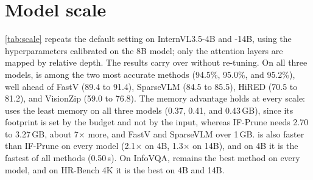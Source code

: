 \section{Model scale}
\label{sec:scale}



\cref{tab:scale} repeats the default setting on InternVL3.5-4B and \mbox{-14B}, using the hyperparameters
calibrated on the 8B model; only the attention layers are mapped by relative depth. The results
carry over without re-tuning. On all three models, \method is among the two most accurate methods
(94.5\%, 95.0\%, and 95.2\%), well ahead of FastV (89.4 to 91.4), SparseVLM (84.5 to 85.5), HiRED (70.5 to 81.2), and
VisionZip (59.0 to 76.8). The memory advantage holds at every scale: \method uses the least memory on all three models
(0.37, 0.41, and 0.43\,GB), since its footprint is set by the budget and not by the input, whereas
IF-Prune needs 2.70 to 3.27\,GB, about 7$\times$ more, and FastV and SparseVLM over 1\,GB. \method is
also faster than IF-Prune on every model (2.1$\times$ on 4B, 1.3$\times$ on 14B), and on 4B it is the
fastest of all methods (0.50\,s). On InfoVQA, \method remains the best method on every model, and on
HR-Bench 4K it is the best on 4B and 14B.
